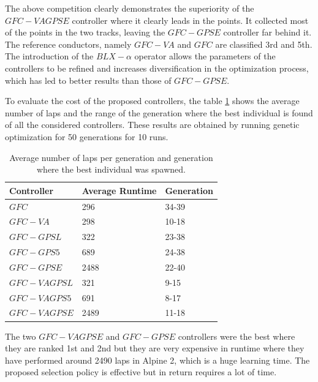 \documentclass[10pt,journal,compsoc]{IEEEtran}
\begin{document}
The above competition clearly demonstrates the superiority of the $GFC-VAGPSE$ controller where it clearly leads in the points. It collected most of the points in the two tracks, leaving the $GFC-GPSE$ controller far behind it. The reference conductors, namely $GFC-VA$ and $GFC$  are classified 3rd and 5th.
The introduction of the $BLX-\alpha$ operator allows the parameters of the controllers to be refined and  increases diversification in the optimization process, which has led to better results than those of $GFC-GPSE$.

To evaluate the cost of the proposed controllers, the table \ref{tab:time} shows the average number of laps %
and the range of the generation where the best individual is found of all the considered controllers. These results are obtained by running genetic
optimization for 50 generations for 10 runs.  

\begin{table}[!ht]
	\centering
	{\scriptsize
          \caption{Average number of laps per generation %
            and
                  generation where the best individual was spawned.}
		\label{tab:time}
		\begin{tabular}{|p{2.85cm}|p{1.65cm}|p{1.65cm}|}
			\hline 	
			\hline  
			Controller& \textbf{Average Runtime}&\textbf{Generation}\\					
			\hline \textbf{\textbf{$GFC$}}&296 &34-39\\
			\hline \textbf{$GFC-VA$}&298	&10-18\\	
			\hline \textbf{$GFC-GPSL$}& 322&23-38\\	
			\hline \textbf{$GFC-GPS5$}&689	&24-38\\	
			\hline \textbf{$GFC-GPSE$}&	2488&22-40\\	
			\hline \textbf{$GFC-VAGPSL$}&321	&9-15\\	
			\hline\textbf{$GFC-VAGPS5$}&	691&8-17\\	
			\hline\textbf{$GFC-VAGPSE$}&2489	&11-18\\					
			\hline 
		\end{tabular}
		
	}
\end{table} 

The two $GFC-VAGPSE$ and $GFC-GPSE$ controllers were the best where they are ranked 1st and 2nd but they are very expensive in runtime where they have performed around 2490 laps in Alpine 2, which is a huge learning time.
The proposed selection policy is effective but in return requires a lot of time.
\end{document}
